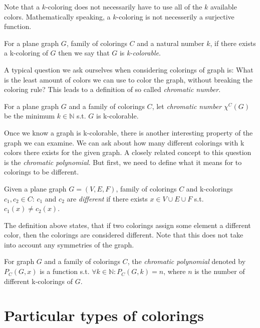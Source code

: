 Note that a $k$-coloring does not necessarily have to use all of the $k$ available colors. Mathematically speaking, a $k$-coloring is not necesserily a surjective function.

\begin{defn}
    For a plane graph $G$, family of colorings $C$ and a natural number $k$, if there exists a k-coloring of $G$ then we say that $G$ is \emph{k-colorable}.
\end{defn}

A typical question we ask ourselves when considering colorings of graph is: What is the least amount of colors we can use to color the graph, without breaking the coloring rule? This leads to a definition of so called \textit{chromatic number}. 


\begin{defn}
    For a plane graph $G$ and a family of colorings $C$, let \emph{chromatic number} $\chi ^C (G)$ be the minimum $k \in \mathbb{N}$ s.t. $G$ is k-colorable.
\end{defn}

Once we know a graph is k-colorable, there is another interesting property of the graph we can examine. We can ask about how many different colorings with k colors there exists for the given graph. A closely related concept to this question is the \emph{chromatic polynomial}. But first, we need to define what it means for to colorings to be different.

\begin{defn}
    Given a plane graph $G=(V,E,F)$, family of colorings $C$ and k-colorings $c_1,c_2 \in C$: $c_1$ and $c_2$ are \emph{different} if there exists $x \in V \cup E \cup F$ s.t. $c_1(x) \neq c_2(x)$.
\end{defn}

The definition above states, that if two colorings assign some element a different color, then the colorings are considered different. Note that this does not take into account any symmetries of the graph.

\begin{defn}
    For graph $G$ and a family of colorings $C$, the \emph{chromatic polynomial} denoted by $P_{C}(G,x)$ is a function s.t. $\forall k \in \mathbb{N} : P_C(G,k) = n$, where $n$ is the number of different k-colorings of $G$.
\end{defn}

\section{Particular types of colorings}

